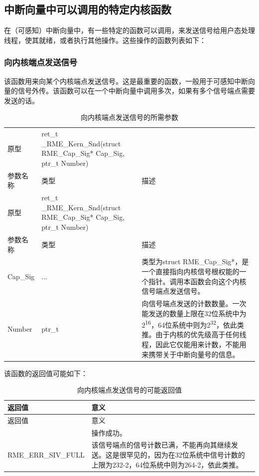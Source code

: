 \subsection{中断向量中可以调用的特定内核函数}\label{subsec:7-specific-kernel-functions-in-interrupt-vectors}

在（可感知）中断向量中，有一些特定的函数可以调用，来发送信号给用户态处理线程，使其就绪，或者执行其他操作。这些操作的函数列表如下：

\subsubsection{向内核端点发送信号}\label{subsubsec:7-send-signal-to-kernel-endpoint}

该函数用来向某个内核端点发送信号。这是最重要的函数，一般用于可感知中断向量的信号外传。该函数可以在一个中断向量中调用多次，如果有多个信号端点需要发送的话。

\begin{xltabular}{\textwidth}{@{}>{\hsize\raggedright\arraybackslash}X>{\hsize\raggedright\arraybackslash}X>{\hsize\raggedright\arraybackslash}X@{}}
\caption{向内核端点发送信号的所需参数}\label{tab:7-25-send-signal-to-kernel-endpoint-parameters}\\
\toprule
原型 & ret\_t \_RME\_Kern\_Snd(struct RME\_Cap\_Sig* Cap\_Sig, ptr\_t
Number) &\tabularnewline
参数名称 & 类型 & 描述\tabularnewline
\endfirsthead
\toprule
原型 & ret\_t \_RME\_Kern\_Snd(struct RME\_Cap\_Sig* Cap\_Sig, ptr\_t
Number) &\tabularnewline
参数名称 & 类型 & 描述\tabularnewline
\midrule
\endhead
\bottomrule
\endlastfoot
Cap\_Sig & ... & 类型为struct
RME\_Cap\_Sig*，是一个直接指向内核信号根权能的一个指针。调用本函数会向这个内核信号端点发送信号。\tabularnewline
Number & ptr\_t &
向信号端点发送的计数数量。一次能发送的数量上限在32位系统中为2\textsuperscript{16}，64位系统中则为2\textsuperscript{32}，依此类推。由于内核的优先级高于任何线程，因此它仅能用来计数，不能用来携带关于中断向量号的信息。\tabularnewline
\end{xltabular}

该函数的返回值可能如下：

\begin{xltabular}{\textwidth}{@{}>{\hsize\raggedright\arraybackslash}X>{\hsize\raggedright\arraybackslash}X@{}}
\caption{向内核端点发送信号的可能返回值}\label{tab:7-26-send-signal-to-kernel-endpoint-return-values}\\
\toprule
返回值 & 意义\tabularnewline
\endfirsthead
\toprule
返回值 & 意义\tabularnewline
\midrule
\endhead
\bottomrule
{} & 操作成功。\tabularnewline
    RME\_ERR\_SIV\_FULL & 该信号端点的信号计数已满，不能再向其继续发送。这是很罕见的，因为在32位系统中信号计数的上限为232-2，64位系统中则为264-2，依此类推。\tabularnewline
\end{xltabular}

